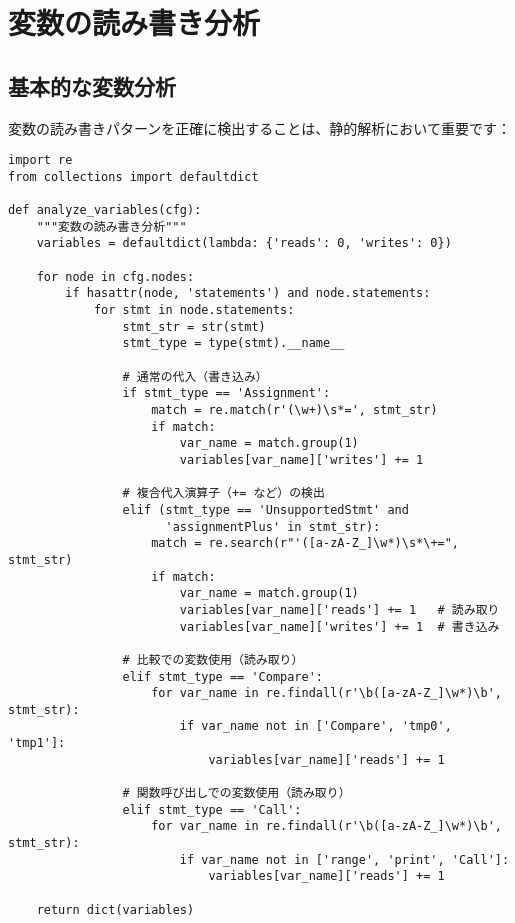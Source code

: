 \documentclass[12pt,a4paper]{article}
\begin{document}
\section{変数の読み書き分析}

\subsection{基本的な変数分析}

変数の読み書きパターンを正確に検出することは、静的解析において重要です：

\begin{lstlisting}[caption=変数の読み書き分析]
import re
from collections import defaultdict

def analyze_variables(cfg):
    """変数の読み書き分析"""
    variables = defaultdict(lambda: {'reads': 0, 'writes': 0})

    for node in cfg.nodes:
        if hasattr(node, 'statements') and node.statements:
            for stmt in node.statements:
                stmt_str = str(stmt)
                stmt_type = type(stmt).__name__

                # 通常の代入（書き込み）
                if stmt_type == 'Assignment':
                    match = re.match(r'(\w+)\s*=', stmt_str)
                    if match:
                        var_name = match.group(1)
                        variables[var_name]['writes'] += 1

                # 複合代入演算子（+= など）の検出
                elif (stmt_type == 'UnsupportedStmt' and
                      'assignmentPlus' in stmt_str):
                    match = re.search(r"'([a-zA-Z_]\w*)\s*\+=", stmt_str)
                    if match:
                        var_name = match.group(1)
                        variables[var_name]['reads'] += 1   # 読み取り
                        variables[var_name]['writes'] += 1  # 書き込み

                # 比較での変数使用（読み取り）
                elif stmt_type == 'Compare':
                    for var_name in re.findall(r'\b([a-zA-Z_]\w*)\b', stmt_str):
                        if var_name not in ['Compare', 'tmp0', 'tmp1']:
                            variables[var_name]['reads'] += 1

                # 関数呼び出しでの変数使用（読み取り）
                elif stmt_type == 'Call':
                    for var_name in re.findall(r'\b([a-zA-Z_]\w*)\b', stmt_str):
                        if var_name not in ['range', 'print', 'Call']:
                            variables[var_name]['reads'] += 1

    return dict(variables)
\end{lstlisting}
\end{document}
